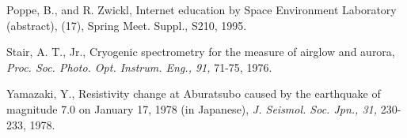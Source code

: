 \begin{article}
\begin{thebibliography}{}
Poppe, B., and R. Zwickl, Internet education by Space 
Environment Laboratory (abstract), (17), 
Spring Meet. Suppl., S210, 1995.

Stair, A. T., Jr., Cryogenic spectrometry for the measure 
of airglow and aurora, {\it Proc. Soc. Photo. Opt. Instrum. 
Eng., 91,} 71-75, 1976.

Yamazaki, Y., Resistivity change at Aburatsubo caused by 
the earthquake of magnitude 7.0 on January 17, 1978 (in 
Japanese), {\it J. Seismol. Soc. Jpn., 31,} 230-233, 1978.

\end{thebibliography}{}
\end{article}

\newpage


%
%



%
%

